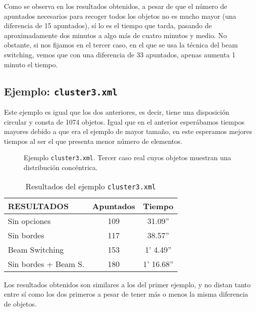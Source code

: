 Como se observa en los resultados obtenidos, a pesar de que el número de
apuntados necesarios para recoger todos los objetos no es mucho mayor (una
diferencia de 15 apuntados), sí lo es el tiempo que tarda, pasando de
aproximadamente dos minutos a algo más de cuatro minutos y medio. No obstante,
si nos fijamos en el tercer caso, en el que se usa la técnica del beam
switching, vemos que con una diferencia de 33 apuntados, apenas aumenta 1 minuto
el tiempo.

\subsection {Ejemplo: \texttt{cluster3.xml}}
Este ejemplo es igual que los dos anteriores, es decir, tiene una disposición
circular y consta de 1074 objetos. Igual que en el anterior esperábamos tiempos
mayores debido a que era el ejemplo de mayor tamaño, en este esperamos mejores
tiempos al ser el que presenta menor número de elementos.

\begin{figure}[!htb]
\centering
{}
\caption{Ejemplo \texttt{cluster3.xml}. Tercer caso real cuyos objetos muestran una distribución concéntrica.}
\end{figure}

\begin{table*}[!ht]
\centering
\begin{tabular}{||l||c|c||}
\hline
\hline
RESULTADOS & Apuntados & Tiempo \\
\hline
\hline
Sin opciones & 109 & 31.09'' \\
\hline
Sin bordes & 117 & 38.57'' \\
\hline
Beam Switching & 153 & 1' 4.49'' \\
\hline
Sin bordes + Beam S. & 180 & 1' 16.68'' \\
\hline
\hline
\end{tabular}
\caption{Resultados del ejemplo \texttt{cluster3.xml}}
\end{table*}

Los resultados obtenidos son similares a los del primer ejemplo, y no distan
tanto entre sí como los dos primeros a pesar de tener más o menos la misma
diferencia de objetos.
